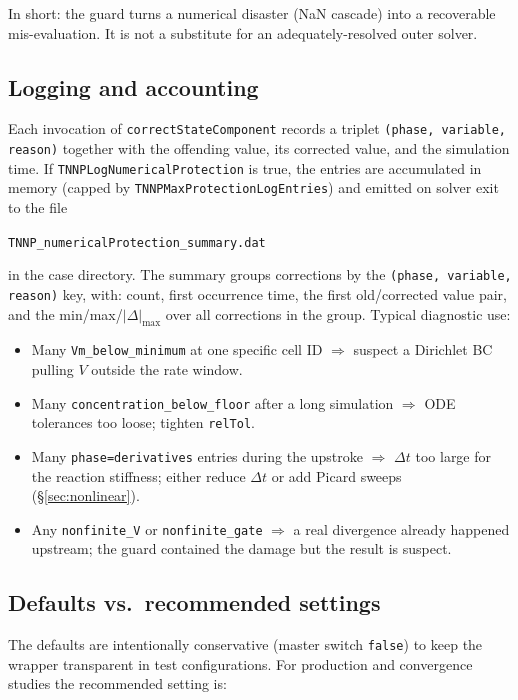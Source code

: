 \documentclass[11pt,a4paper]{article}
\newcommand{\code}[1]{\texttt{\small #1}}
\begin{document}
In short: the guard turns a numerical disaster (NaN cascade) into a
recoverable mis-evaluation. It is not a substitute for an
adequately-resolved outer solver.

\subsection{Logging and accounting}
\label{sec:tnnp:log}

Each invocation of \code{correctStateComponent} records a triplet
\code{(phase, variable, reason)} together with the offending value,
its corrected value, and the simulation time. If
\code{TNNPLogNumericalProtection} is true, the entries are accumulated
in memory (capped by \code{TNNPMaxProtectionLogEntries}) and emitted
on solver exit to the file

\smallskip
\code{TNNP\_numericalProtection\_summary.dat}
\smallskip

\noindent in the case directory. The summary groups corrections by
the \code{(phase, variable, reason)} key, with: count, first
occurrence time, the first old/corrected value pair, and the
min/max/$|\Delta|_{\max}$ over all corrections in the group. Typical
diagnostic use:

\begin{itemize}[leftmargin=*]
\item Many \code{Vm\_below\_minimum} at one specific cell ID $\Rightarrow$
suspect a Dirichlet BC pulling $V$ outside the rate window.
\item Many \code{concentration\_below\_floor} after a long simulation
$\Rightarrow$ ODE tolerances too loose; tighten \code{relTol}.
\item Many \code{phase=derivatives} entries during the upstroke
$\Rightarrow$ $\Delta t$ too large for the reaction stiffness; either
reduce $\Delta t$ or add Picard sweeps (\S\ref{sec:nonlinear}).
\item Any \code{nonfinite\_V} or \code{nonfinite\_gate}
$\Rightarrow$ a real divergence already happened upstream; the guard
contained the damage but the result is suspect.
\end{itemize}

\subsection{Defaults vs.\ recommended settings}
\label{sec:tnnp:settings}

The defaults are intentionally conservative (master switch \code{false})
to keep the wrapper transparent in test configurations. For production
and convergence studies the recommended setting is:
\end{document}
